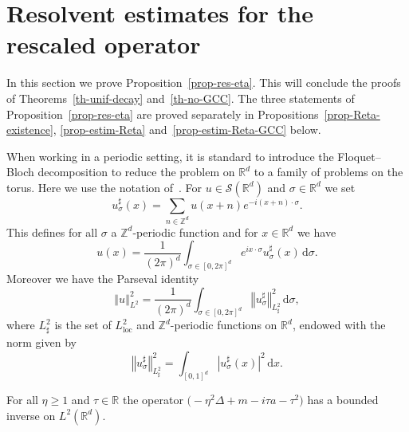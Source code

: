 \documentclass[10pt]{amsart}
\theoremstyle{definition}\newtheorem{defi}[theo]{Definition}\newtheorem{rema}[theo]{Remark}\newtheorem{exam}[theo]{Example}\newtheorem{exem}[theo]{Example}\newtheorem{nota}[theo]{Notation}
\newcommand{\abs}[1]{\left\vert #1\right\vert}
\newcommand{\nr}[1]{\left\Vert #1\right\Vert}
\renewcommand{\geq}{\geqslant}
\newcommand{\1}{\mathds 1}
\newcommand{\loc}{{\mathrm{loc}}}
\newcommand{\R}{\mathbb{R}}
\newcommand{\D}{\Delta}
\newcommand{\s}{\sigma}
\renewcommand{\t}{\tau}
\newcommand{\Sc}{{\mathcal S}}
\newcommand{\dd}{\mathrm{d}}
\newcommand{\dx}{\dd x}
\newcommand{\dsigma}{\dd \sigma}
\begin{document}
\section{Resolvent estimates for the rescaled operator} \label{sec-resolvent-L2}

In this section we prove Proposition~\ref{prop-res-eta}. This will conclude the proofs of Theorems~\ref{th-unif-decay} and~\ref{th-no-GCC}. The three statements of Proposition~\ref{prop-res-eta} are proved separately in Propositions~\ref{prop-Reta-existence}, \ref{prop-estim-Reta} and~\ref{prop-estim-Reta-GCC} below.%

When working in a periodic setting, it is standard to introduce the Floquet--Bloch decomposition to reduce the problem on $\R^d$ to a family of problems on the torus. Here we use the notation of~\cite{JolyRo18}. For $u \in \Sc(\R^d)$ and $\s \in \R^d$ we set
\[
u^\sharp_\s (x) = \sum_{n \in \mathbb Z^d} u(x + n) e^{-i(x+n)\cdot \s}.
\]
This defines for all $\s$ a $\mathbb Z^d$-periodic function and for $x \in \R^d$ we have
\[
u(x) = \frac 1 {(2\pi)^d} \int_{\s \in [0,2\pi]^d} e^{ix\cdot \s} u^\sharp_\s(x) \, \dsigma.
\]
Moreover we have the Parseval identity
\[
\nr{u}_{L^2}^2 = \frac 1 {(2\pi)^d} \int_{\s \in [0,2\pi]^d} \nr{u_\s^\sharp}_{L^2_\sharp}^2 \, \dsigma,
\]
where $L^2_\sharp$ is the set of $L^2_\loc$ and $\mathbb Z^d$-periodic functions on $\R^d$, endowed with the norm given by
\[
\nr{u_\s^\sharp}_{L^2_\sharp}^2 = \int_{[0,1]^d} \abs{u_\s^\sharp(x)}^2 \, \dx.
\]

\begin{prop}\label{prop-Reta-existence}
For all $\eta \geq 1$ and $\t \in \R$ the operator $\big(-\eta^2 \D + m - i\t a - \t^2 \big)$ has a bounded inverse on $L^2(\R^d)$.
\end{prop}
\end{document}
